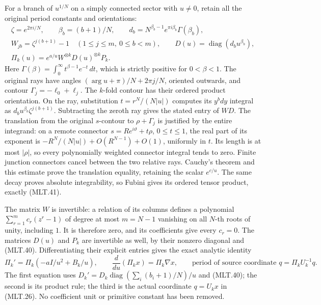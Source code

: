 For a branch of \(u^{1/N}\) on
a simply connected sector with \(u\ne0\),
retain all the original period constants
and orientations:
\[
 \begin{gathered}
 \zeta=e^{2\pi i/N},\qquad
 \beta_b=(b+1)/N,\qquad
 d_b=N^{\beta_b-1}e^{\pi i\beta_b}\Gamma(\beta_b),\\
 W_{jb}=\zeta^{j(b+1)}-1\quad(1\le j\le m,\ 0\le b<m),
 \qquad D(u)=\operatorname{diag}(d_bu^{\beta_b}),\\
 \Pi_k(u)=e^{a/u}W^{\otimes k}D(u)^{\otimes k}P_k .
 \end{gathered}                                             \tag{MLT.41}
\]
Here \(\Gamma(\beta)=\int_0^\infty
t^{\beta-1}e^{-t}\,dt\), which is
strictly positive for \(0<\beta<1\).
The original rays have angles
\((\arg u+\pi)/N+2\pi j/N\), oriented
outwards, and contour
\(\Gamma_j=-\ell_0+\ell_j\).
The \(k\)-fold contour has their
ordered product orientation.
On the ray, substitution
\(t=r^N/(N|u|)\) computes its
\(y^bdy\) integral as
\(d_bu^{\beta_b}\zeta^{j(b+1)}\).
Subtracting the zeroth ray gives
the stated entry of \(WD\).
The translation from the original
\(s\)-contour to \(\rho+\Gamma_j\)
is justified by the entire integrand:
on a remote connector
\(s=Re^{i\vartheta}+t\rho\),
\(0\le t\le1\), the real part
of its exponent is
\(-R^N/(N|u|)+O(R^{N-1})+O(1)\),
uniformly in \(t\). Its length is
at most \(|\rho|\), so every
polynomially weighted connector
integral tends to zero. Finite
junction connectors cancel between
the two relative rays. Cauchy's
theorem and this estimate prove
the translation equality, retaining
the scalar \(e^{c/u}\). The same
decay proves absolute integrability,
so Fubini gives its ordered tensor
product, exactly (MLT.41).

The matrix \(W\) is invertible:
a relation of its columns defines
a polynomial
\(\sum_{r=1}^m c_r(z^r-1)\)
of degree at most \(m=N-1\)
vanishing on all \(N\)-th roots
of unity, including \(1\).
It is therefore zero, and its
coefficients give every \(c_r=0\).
The matrices \(D(u)\) and \(P_k\)
are invertible as well, by their
nonzero diagonal and (MLT.40).
Differentiating their explicit
entries gives the exact analytic
identity
\[
 \Pi_k'=\Pi_k(-aI/u^2+B_k/u),\qquad
 \frac{d}{du}(\Pi_k x)=\Pi_k\nabla x,\qquad
 \text{period of source coordinate }q
       =\Pi_kU_k^{-1}q.                                  \tag{MLT.42}
\]
The first equation uses
\(D_k'=D_k\operatorname{diag}
(\sum_i(b_i+1)/N)/u\) and (MLT.40);
the second is its product rule;
the third is the actual coordinate
\(q=U_kx\) in (MLT.26).
No coefficient unit or primitive
constant has been removed.

